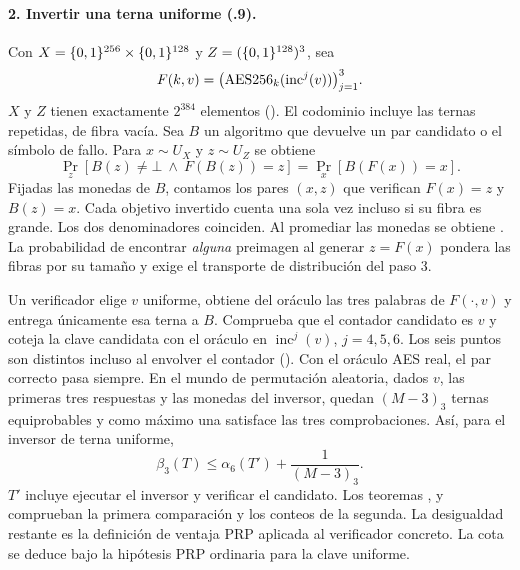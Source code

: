 \paragraph{2. Invertir una terna uniforme (.9).}
Con \(X=\{0,1\}^{256}\times\{0,1\}^{128}\) y \(Z=(\{0,1\}^{128})^3\), sea
\[
 F(k,v)=\bigl(\operatorname{AES256}_k(\operatorname{inc}^{j}(v))\bigr)_{j=1}^3 .
\]
\(X\) y \(Z\) tienen exactamente \(2^{384}\) elementos
(). El codominio
incluye las ternas repetidas, de fibra vacía. Sea \(B\) un algoritmo que
devuelve un par candidato o el símbolo de fallo. Para \(x\sim U_X\) y
\(z\sim U_Z\) se obtiene
\[
 \Pr_z[B(z)\ne\bot\ \wedge\ F(B(z))=z]
       =\Pr_x[B(F(x))=x].
\]
Fijadas las monedas de \(B\), contamos los pares \((x,z)\) que verifican
\(F(x)=z\) y \(B(z)=x\). Cada objetivo invertido cuenta una sola vez incluso
si su fibra es grande. Los dos denominadores coinciden. Al promediar las
monedas se obtiene . La probabilidad de
encontrar \emph{alguna} preimagen al generar \(z=F(x)\) pondera las fibras
por su tamaño y exige el transporte de distribución del paso 3.

Un verificador elige \(v\) uniforme, obtiene del oráculo las tres palabras
de \(F(\cdot,v)\) y entrega únicamente esa terna a \(B\). Comprueba que el
contador candidato es \(v\) y coteja la clave candidata con el oráculo en
\(\operatorname{inc}^{j}(v)\), \(j=4,5,6\). Los seis puntos son distintos
incluso al envolver el contador (). Con el oráculo AES real, el par correcto
pasa siempre. En el mundo de permutación aleatoria, dados \(v\), las
primeras tres respuestas y las monedas del inversor, quedan \((M-3)_3\)
ternas equiprobables y como máximo una satisface las tres comprobaciones.
Así, para el inversor de terna uniforme,
\[
 \beta_3(T)\le \alpha_6(T')+\frac{1}{(M-3)_3}.
\]
\(T'\) incluye ejecutar el inversor y verificar el candidato. Los teoremas
,
 y  comprueban
la primera comparación y los conteos de la segunda. La desigualdad restante
es la definición de ventaja PRP aplicada al verificador concreto.
La cota se deduce bajo la hipótesis PRP ordinaria para la clave uniforme.

